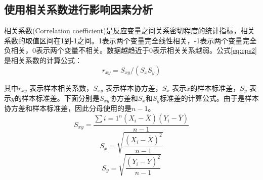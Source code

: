 \documentclass{xcumcmart}
\begin{document}
\subsection{使用相关系数进行影响因素分析}
相关系数(Correlation coefficient)是反应变量之间关系密切程度的统计指标，相关系数的取值区间在1到-1之间。1表示两个变量完全线性相关，-1表示两个变量完全负相关，0表示两个变量不相关。数据越趋近于0表示相关关系越弱。公式\ref{eq:eps2}是相关系数的计算公式：
\begin{equation} \label{eq:eps2}
    r_{xy}=S_{xy}/(S_xS_y )
\end{equation}

其中$r_{xy}$ 表示样本相关系数，$S_{xy}$ 表示样本协方差，$S_x$ 表示$x$的样本标准差，$S_y$  表示$y$的样本标准差。下面分别是$S_{xy}$协方差和$S_x$和$S_y$标准差的计算公式。由于是样本协方差和样本标准差，因此分母使用的是$n-1$。
\[S_{xy}=\frac{\sum{i=1}^n(X_i-\overline{X})(Y_i-\overline{Y})}{n-1}\]
\[S_x=\sqrt{\frac{(X_i-\overline{X})^2}{n-1}}\]
\[S_y=\sqrt{\frac{(Y_i-\overline{Y})^2}{n-1}}\]
\end{document}

